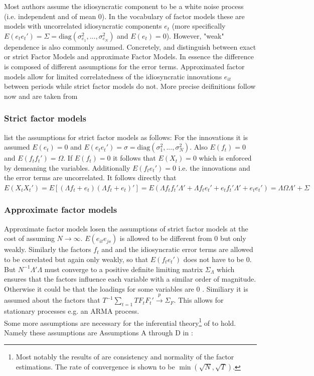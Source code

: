 \documentclass[12pt]{article}
\begin{document}
Most authors assume the idiosyncratic component to be a white noise process (i.e. independent and of mean 0). In the vocabulary of factor models these are models with uncorrelated idiosyncratic components $e_t$ (more specifically $E(e_t e_t') = \Sigma = \text{diag}(\sigma_{e_1}^2, ..., \sigma_{e_N}^2)$ and $E(e_t) = 0$).
However, "weak" dependence is also commonly assumed. Concretely, \citet{geweke1977dynamic} and \citet{sargent1977business} distinguish between exact or strict Factor Models and approximate Factor Models. In essence the difference is composed of different assumptions for the error terms. Approximated factor models allow for limited correlatedness of the idiosyncratic innovations $e_{it}$ between periods while strict factor models do not. More precise deifinitions follow now and are taken from \citet{breitung2006dynamic}
\subsubsection*{Strict factor models}
\citet{breitung2006dynamic} list the assumptions for strict factor models as follows: For the innovations it is assumed $E(e_t) = 0$ and $E(e_te_t') = \sigma = \text{diag}(\sigma_1^2, ..., \sigma_N^2)$. Also $E(f_t) = 0$ and $E(f_tf_t') = \Omega$. If $E(f_t) = 0$ it follows that $E(X_t) = 0$ which is enforced by demeaning the variables. Additionally $E(f_t e_t') = 0$ i.e. the innovations and the error terms are uncorrelated. It follows directly that $E(X_tX_t') = E[(\Lambda f_t +e_t) (\Lambda f_t + e_t)'] = E(\Lambda f_t f_t' \Lambda' + \Lambda f_t e_t' + e_t f_t' \Lambda' + e_t e_t') = \Lambda \Omega \Lambda' + \Sigma$ 
\subsubsection*{Approximate factor models}
Approximate factor models losen the assumptions of strict factor models at the cost of assuming $N \to \infty$.
$E(e_{it}e_{js})$ is allowed to be different from $0$ but only weakly. Similarly the factors $f_t$ and and the idiosyncratic error terms are allowed to be correlated but again only weakly, so that $E(f_t e_t')$ does not have to be $0$. But $N^{-1}\Lambda'\Lambda$ must converge to a positive definite limiting matrix $\Sigma_\Lambda$ which ensures that the factors influence each variable with a similar order of magnitude. Otherwise it could be that the loadings for some variables are $0$ \citep{breitung2006dynamic}. Similiary it is assumed about the factors that $T^{-1}\sum_{t=1}TF_tF_t' \overset{p}{\to} \Sigma_F$. This allows for stationary processes e.g. an ARMA process. \\
Some more assumptions are necessary for the inferential theory\footnote{Most notably the results of \citet{bai2003inferential} are consistency and normality of the factor estimations. The rate of convergence is shown to be $\min(\sqrt{N}, \sqrt{T})$.} of \citet{bai2003inferential} to hold. Namely these assumptions are Assumptions A through D in \citet{bai2003inferential}:
\end{document}
